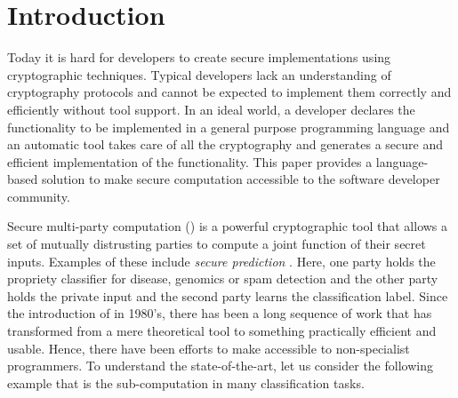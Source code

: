   

\section{Introduction}
\label{sec:intro}

Today it is hard for developers to create secure implementations using cryptographic techniques.
Typical developers lack an understanding of cryptography protocols
and cannot be expected to implement them correctly and efficiently without tool
support.
In an ideal world, a developer declares the functionality to be implemented
in a general purpose programming language and an automatic tool takes care
of all the cryptography and generates a secure and efficient implementation  of the functionality. 
This paper provides a language-based solution to make
secure  computation  accessible to the software developer community. 



Secure multi-party computation (\mpc) \cite{yao,gmw} is a powerful
cryptographic tool that allows a set of mutually distrusting parties
to compute a joint function of their secret inputs. Examples of these
include {\em secure prediction} \cite{shafindss,wu,barni,minionn,secureml}. Here,  one party holds the propriety classifier for disease, genomics or spam detection and the other party  
holds the private input and the second party learns the classification label. Since the introduction of
\mpc in 1980's, there has been a long sequence of work that has
transformed \mpc from a mere theoretical tool to something practically
efficient and usable. Hence, there have been efforts to make \mpc
accessible to non-specialist programmers. To understand the
state-of-the-art, let us consider the following 
example that is the sub-computation in many classification tasks.


